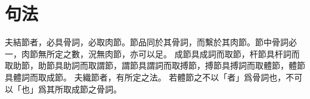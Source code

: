 \chapter*{句法}
夫結節者，必具骨詞，必取肉節。節品同於其骨詞，而繫於其肉節。節中骨詞必一，肉節無所定之數，況無肉節，亦可以足。
成節具成詞而取節，杆節具杆詞而取助節，助節具助詞而取謂節，謂節具謂詞而取搏節，搏節具搏詞而取體節，體節具體詞而取成節。
夫織節者，有所定之法。
若體節之不以「者」爲骨詞也，不可以「也」爲其所取成節之骨詞。
